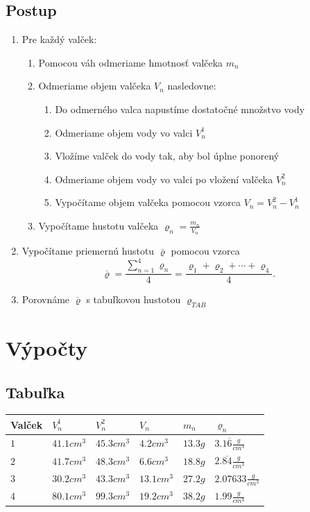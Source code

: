 \documentclass{article}
\begin{document}
\subsection{Postup}
\begin {enumerate}
\item  Pre každý valček:
\begin{enumerate}
\item   Pomocou váh odmeriame hmotnosť valčeka $m_n$
\item   Odmeriame objem valčeka $V_n$ nasledovne:
\begin{enumerate}
\item    Do odmerného valca napustíme dostatočné množstvo vody
\item    Odmeriame objem vody vo valci $V_n^1$
\item    Vložíme valček do vody tak, aby bol úplne ponorený
\item    Odmeriame objem vody vo valci po vložení valčeka $V_n^2$
\item    Vypočítame objem valčeka pomocou vzorca $V_n=V_n^2-V_n^1$
\end{enumerate}
\item   Vypočítame hustotu valčeka $\varrho_n=\frac{m_n}{V_n}$
\end{enumerate}
\item  Vypočítame priemernú hustotu 
	$  \overline{ \varrho}$ pomocou vzorca 
	\[
		\overline{ \varrho}=\frac{ \displaystyle \sum _{n=1} ^{ 4} \varrho_n}{4}=\frac{ \varrho_1+\varrho_2+\cdots+\varrho_4}{ 4}.
	\] 
\item Porovnáme $ \overline{ \varrho}$ s tabuľkovou hustotou $\varrho_{TAB}$
\end{enumerate}
\section{Výpočty}
\subsection{Tabuľka}
\begin{tabular}{ |p{2cm}|p{2cm}|p{2cm}|p{2cm}|p{2cm}|p{2cm}|}

	\hline 
	Valček & $V_n^1$ & $V_n^2$ & $V_n$ & $m_n$ & $\varrho_n$ \\
	\hline 
	$1$ & $41.1 cm^3$ & $45.3 cm^3$ & $4.2 cm^3$ & $13.3 g$ & $3.1\overline{6} \frac{g}{cm^3}$ \\
	\hline
	$2$ & $41.7 cm^3$ & $48.3 cm^3$ & $6.6 cm^3$ & $18.8 g$ & $2.\overline{84} \frac{g}{cm^3}$ \\
	\hline
	$3$ & $30.2 cm^3$ & $43.3 cm^3$ & $13.1 cm^3$ & $27.2 g$ & $2.07633 \frac{g}{cm^3}$ \\
	\hline
	$4$ & $80.1 cm^3$ & $99.3 cm^3$ & $19.2 cm^3$ & $38.2 g$ & $1.99 \frac{g}{cm^3}$ \\
	\hline
\end{tabular}
\end{document}
